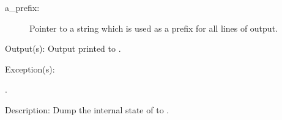 \begin{capi}
\begin{capilist}
\begin{description}
		\item[a\_prefix: ]
			Pointer to a string which is used as a prefix for all
			lines of output.
		\end{description}
	\item[Output(s): ]
		Output printed to .
	\item[Exception(s): ]
		\begin{description}\item[]
		\item[.]
		\end{description}
	\item[Description: ]
		Dump the internal state of  to .
	\end{capilist}
\end{capi}
